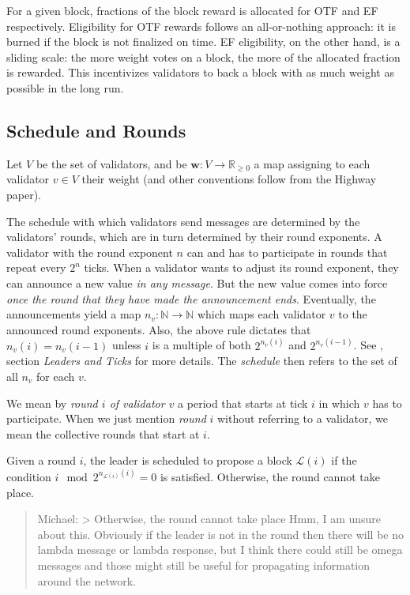 For a given block, fractions of the block reward is allocated for OTF and EF respectively. Eligibility for OTF rewards follows an all-or-nothing approach: it is burned if the block is not finalized on time. EF eligibility, on the other hand, is a sliding scale: the more weight votes on a block, the more of the allocated fraction is rewarded. This incentivizes validators to back a block with as much weight as possible in the long run.

\subsection{Schedule and Rounds}
\label{sec:schedule}

Let $V$ be the set of validators, and be $\boldsymbol{w}:V\to \mathbb{R}_{\geq 0}$ a map assigning to each validator $v\in V$ their weight (and other conventions follow from the Highway paper).

The schedule with which validators send messages are determined by the validators' rounds, which are in turn determined by their round exponents. A validator with the round exponent $n$ can and has to participate in rounds that repeat every $2^n$ ticks. When a validator wants to adjust its round exponent, they can announce a new value \emph{in any message}. But the new value comes into force \emph{once the round that they have made the announcement ends}. Eventually, the announcements yield a map $n_v: \mathbb{N}\to \mathbb{N}$ which maps each validator $v$ to the announced round exponents. Also, the above rule dictates that $n_v(i)=n_v(i-1)$ unless $i$ is a multiple of both $2^{n_v(i)}$ and $2^{n_v(i-1)}$. See \cite{kane2019casperlabs}, section \emph{Leaders and Ticks} for more details. The \emph{schedule} then refers to the set of all $n_v$ for each $v$.

We mean by \emph{round $i$ of validator $v$} a period that starts at tick $i$ in which $v$ has to participate. When we just mention \emph{round} $i$ without referring to a validator, we mean the collective rounds that start at $i$.

Given a round $i$, the leader is scheduled to propose a block $\mathcal{L}(i)$ if the condition $i\mod 2^{n_{\mathcal{L}(i)}(i)}=0$ is satisfied. Otherwise, the round cannot take place.

\begin{quote}
Michael: \textgreater{} Otherwise, the round cannot take place Hmm, I am unsure about this. Obviously if the leader is not in the round then there will be no lambda message or lambda response, but I think there could still be omega messages and those might still be useful for propagating information around the network.
\end{quote}

